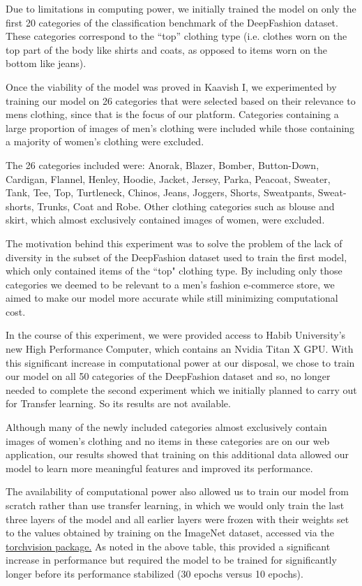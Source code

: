 Due to limitations in computing power, we initially trained the model on only the first 20 categories of the classification benchmark of the DeepFashion dataset. These categories correspond to the “top” clothing type (i.e. clothes worn on the top part of the body like shirts and coats, as opposed to items worn on the bottom like jeans). 

Once the viability of the model was proved in Kaavish I, we experimented by training our model on 26 categories that were selected based on their relevance to mens clothing, since that is the focus of our platform. Categories containing a large proportion of images of men's clothing were included while those containing a majority of women's clothing were excluded. 

The 26 categories included were: Anorak, Blazer, Bomber, Button-Down, Cardigan, Flannel, Henley, Hoodie, Jacket, Jersey, Parka, Peacoat, Sweater, Tank, Tee, Top, Turtleneck, Chinos, Jeans, Joggers, Shorts, Sweatpants, Sweat-shorts, Trunks, Coat and Robe. Other clothing categories such as blouse and skirt, which almost exclusively contained images of women, were excluded.

The motivation behind this experiment was to solve the problem of the lack of diversity in the subset of the DeepFashion dataset used to train the first model, which only contained items of the ``top" clothing type. By including only those categories we deemed to be relevant to a men’s fashion e-commerce store, we aimed to make our model more accurate while still minimizing computational cost. 

In the course of this experiment, we were provided access to Habib University’s new High Performance Computer, which contains an Nvidia Titan X GPU. With this significant increase in computational power at our disposal, we chose to train our model on all 50 categories of the DeepFashion dataset and so, no longer needed to complete the second experiment which we initially planned to carry out for Transfer learning. So its results are not available.

Although many of the newly included categories almost exclusively contain images of women’s clothing and no items in these categories are on our web application, our results showed that training on this additional data allowed our model to learn more meaningful features and improved its performance.

The availability of computational power also allowed us to train our model from scratch rather than use transfer learning, in which we would only train the last three layers of the model and all earlier layers were frozen with their weights set to the values obtained by training on the ImageNet dataset, accessed via the  \href{https://pytorch.org/docs/stable/torchvision}{torchvision package.} As noted in the above table, this provided a significant increase in performance but required the model to be trained for significantly longer before its performance stabilized (30 epochs versus 10 epochs).

